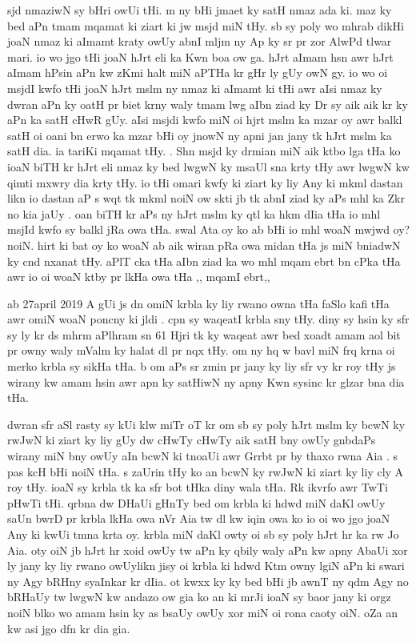 \documentclass[a4paper]{article}
\begin{document}
sjd nmaziwN sy bHri owUi tHi.
m ny bHi jmaet ky satH nmaz ada ki.
maz ky bed  aPn tmam mqamat ki ziart ki jw  msjd miN tHy.
sb sy poly wo mhrab dikHi joaN nmaz ki aImamt kraty owUy  abnI mljm ny Ap ky sr pr zor AlwPd tlwar mari.
io wo jgo tHi joaN hJrt eli ka Kwn boa ow ga.
hJrt aImam hsn awr hJrt aImam hPsin aPn kw zKmi halt  miN aPTHa kr gHr ly gUy owN gy.
io wo oi msjdI kwfo tHi joaN hJrt mslm ny nmaz ki aImamt ki tHi awr aIsi nmaz ky dwran aPn ky oatH pr biet krny waly tmam lwg aIbn ziad ky Dr sy aik aik kr ky aPn ka satH cHwR gUy.
aIsi msjdi kwfo miN oi hjrt mslm ka mzar oy awr balkl satH oi oani bn erwo ka mzar bHi oy jnowN ny apni jan jany tk hJrt mslm ka satH dia.
ia tariKi mqamat tHy.
. Shn msjd ky drmian miN  aik ktbo lga tHa ko ioaN biTH kr hJrt eli nmaz ky bed lwgwN  ky msaUl sna krty tHy awr lwgwN kw qimti mxwry dia krty tHy.
io tHi omari kwfy ki ziart ky liy Any ki mkml dastan likn io dastan aP s wqt tk mkml noiN ow skti jb tk abnI ziad  ky aPs mhl ka Zkr no kia jaUy .
oan biTH kr aPs ny hJrt mslm ky qtl ka hkm dIia tHa io mhl msjId kwfo sy balkl jRa owa tHa.
swal Ata oy ko ab bHi io mhl woaN mwjwd oy? noiN.
hirt ki bat oy ko woaN ab aik  wiran pRa owa midan tHa js miN bniadwN ky cnd nxanat tHy.
aPlT cka tHa  aIbn ziad ka wo mhl mqam ebrt bn cPka tHa awr io oi woaN ktby pr lkHa owa tHa ,, mqamI ebrt,,

ab 27april 2019 A gUi js dn omiN krbla ky liy rwano owna tHa faSlo kafi tHa awr omiN woaN  poncny ki jldi .
cpn sy waqeatI krbla sny tHy.
diny sy hsin ky sfr  sy ly kr ds mhrm aPlhram sn 61 Hjri tk ky waqeat awr bed xoadt amam aol bit pr owny waly mValm ky halat dl pr nqx tHy.
om ny hq w bavl miN frq krna  oi merko krbla sy sikHa tHa.
b om  aPs sr  zmin pr jany ky liy sfr vy kr roy tHy js wirany kw amam hsin awr  apn ky satHiwN  ny apny Kwn sysinc kr glzar bna dia tHa.

dwran sfr aSl rasty sy kUi klw miTr oT kr om sb sy poly hJrt mslm ky bcwN ky rwJwN ki ziart ky liy gUy dw cHwTy cHwTy aik satH bny owUy gnbdaPs wirany miN bny owUy aIn bcwN ki tnoaUi awr Grrbt pr by thaxo rwna Aia .
s pas kcH bHi noiN tHa.
s zaUrin tHy ko an bcwN ky rwJwN ki ziart ky liy cly A roy tHy.
ioaN sy krbla tk ka sfr bot tHka diny wala tHa.
Rk ikvrfo awr TwTi pHwTi tHi.
qrbna dw DHaUi gHnTy bed om krbla ki hdwd miN daKl owUy saUn bwrD pr krbla lkHa owa nVr Aia tw dl kw iqin owa ko io oi wo jgo joaN Any ki kwUi tmna krta oy.
krbla miN daKl owty oi sb sy poly hJrt hr ka rw Jo Aia.
oty oiN jb hJrt hr xoid owUy tw aPn ky qbily waly aPn kw  apny AbaUi xor  ly jany ky liy rwano owUylikn jisy oi krbla ki hdwd Ktm owny lgiN aPn ki swari ny Agy bRHny syaInkar kr dIia.
ot kwxx ky ky bed bHi jb awnT ny qdm Agy no bRHaUy tw lwgwN kw andazo ow gia ko an ki mrJi ioaN sy baor jany ki orgz noiN blko wo amam hsin ky as bsaUy owUy xor miN oi rona caoty oiN.
oZa an kw asi jgo dfn kr dia gia.
\end{document}
